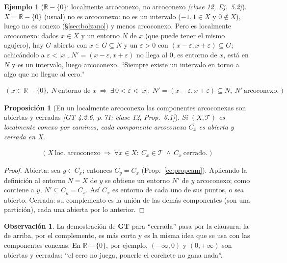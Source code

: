 \documentclass[11pt,a4paper]{article}
\newcommand{\lgc}[1]{\par\vspace{-3pt}\begin{gather*}\big(\;#1\;\big)\end{gather*}\vspace{-6pt}}
\theoremstyle{definition}
\newtheorem{ejemplo}[definicion]{Ejemplo}
\newtheorem{observacion}[definicion]{Observación}
\theoremstyle{plain}
\newtheorem{proposicion}[definicion]{Proposición}
\newcommand{\fnt}[1]{{\normalfont\small\itshape\color{gray!150!black}[#1]}}
\newcommand{\R}{\mathbb{R}}
\newcommand{\tp}{\mathcal{T}}
\begin{document}
\begin{ejemplo}[$\R-\{0\}$: localmente arcoconexo, no arcoconexo \fnt{clase 12, Ej.\ 5.2}]\label{cc:Rmenos0}
$X=\R-\{0\}$ (usual) no es arcoconexo: no es un intervalo ($-1,1\in X$ y $0\notin X$), luego no es conexo (\S\ref{sec:bolzano}) y menos arcoconexo. Pero es localmente arcoconexo: dados $x\in X$ y un entorno $N$ de $x$ (que puede tener el mismo agujero), hay $G$ abierto con $x\in G\subseteq N$ y un $\varepsilon>0$ con $(x-\varepsilon,x+\varepsilon)\subseteq G$; achicándolo a $\varepsilon<|x|$, $N'=(x-\varepsilon,x+\varepsilon)$ no llega al $0$, es entorno de $x$, está en $N$ y es un intervalo, luego arcoconexo. ``Siempre existe un intervalo en torno a algo que no llegue al cero.''
\lgc{x\in\R-\{0\},\ N\ \text{entorno de } x\ \Rightarrow\ \exists\,0<\varepsilon<|x|:\ N'=(x-\varepsilon,x+\varepsilon)\subseteq N,\ N'\ \text{arcoconexo}.}
\end{ejemplo}

\begin{proposicion}[En un localmente arcoconexo las componentes arcoconexas son abiertas y cerradas \fnt{GT 4.2.6, p.\,71; clase 12, Prop.\ 6.1}]\label{cc:compabcam}
Si $(X,\tp)$ es localmente conexo por caminos, cada componente arcoconexa $C_x$ es abierta y cerrada en $X$.
\lgc{X\ \text{loc.\ arcoconexo}\ \Rightarrow\ \forall x\in X:\ C_x\in\tp\ \wedge\ C_x\ \text{cerrado}.}
\end{proposicion}

\begin{proof}
Abierta: sea $y\in C_x$; entonces $C_y=C_x$ (Prop.~\ref{cc:propcam}). Aplicando la definición al entorno $N=X$ de $y$ se obtiene un entorno $N'$ de $y$ arcoconexo; como contiene a $y$, $N'\subseteq C_y=C_x$. Así $C_x$ es entorno de cada uno de sus puntos, o sea abierto.
Cerrada: su complemento es la unión de las demás componentes (son una partición), cada una abierta por lo anterior.
\end{proof}

\begin{observacion}
La demostración de \textbf{GT} para ``cerrada'' pasa por la clausura; la de arriba, por el complemento, es más corta y es la misma idea que se usa con las componentes conexas. En $\R-\{0\}$, por ejemplo, $(-\infty,0)$ y $(0,+\infty)$ son abiertas y cerradas: ``el cero no juega, ponerle el corchete no gana nada''.
\end{observacion}
\end{document}
